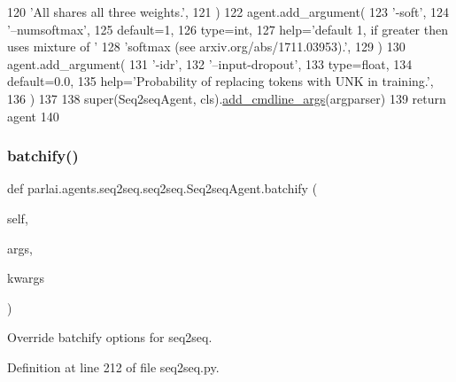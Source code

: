 \begin{DoxyCode}
120             \textcolor{stringliteral}{'All shares all three weights.'},
121         )
122         agent.add\_argument(
123             \textcolor{stringliteral}{'-soft'},
124             \textcolor{stringliteral}{'--numsoftmax'},
125             default=1,
126             type=int,
127             help=\textcolor{stringliteral}{'default 1, if greater then uses mixture of '}
128             \textcolor{stringliteral}{'softmax (see arxiv.org/abs/1711.03953).'},
129         )
130         agent.add\_argument(
131             \textcolor{stringliteral}{'-idr'},
132             \textcolor{stringliteral}{'--input-dropout'},
133             type=float,
134             default=0.0,
135             help=\textcolor{stringliteral}{'Probability of replacing tokens with UNK in training.'},
136         )
137 
138         super(Seq2seqAgent, cls).\hyperlink{namespaceparlai_1_1agents_1_1drqa_1_1config_a62fdd5554f1da6be0cba185271058320}{add\_cmdline\_args}(argparser)
139         \textcolor{keywordflow}{return} agent
140 
\end{DoxyCode}
\mbox{\label{classparlai_1_1agents_1_1seq2seq_1_1seq2seq_1_1Seq2seqAgent_ab7917b41c18eea62f9e7b63c36466bb6}} 
\subsubsection{\texorpdfstring{batchify()}{batchify()}}
{\footnotesize\ttfamily def parlai.\+agents.\+seq2seq.\+seq2seq.\+Seq2seq\+Agent.\+batchify (\begin{DoxyParamCaption}\item[{}]{self,  }\item[{}]{args,  }\item[{}]{kwargs }\end{DoxyParamCaption})}

\begin{DoxyVerb}Override batchify options for seq2seq.
\end{DoxyVerb}
 

Definition at line 212 of file seq2seq.\+py.


